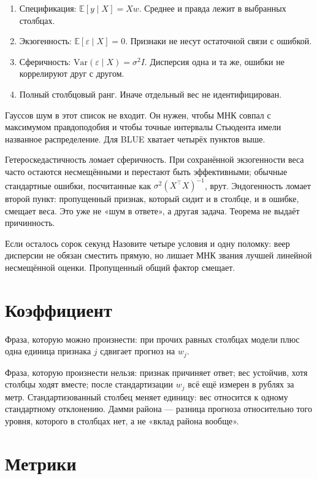 \documentclass[11pt,a4paper]{article}
\begin{document}
\begin{enumerate}
\item Спецификация: \(\mathbb E[y\mid X]=Xw\). Среднее и правда лежит в выбранных столбцах.
\item Экзогенность: \(\mathbb E[\varepsilon\mid X]=0\). Признаки не несут остаточной связи с ошибкой.
\item Сферичность: \(\mathrm{Var}(\varepsilon\mid X)=\sigma^{2}I\). Дисперсия одна и та же, ошибки не коррелируют друг с другом.
\item Полный столбцовый ранг. Иначе отдельный вес не идентифицирован.
\end{enumerate}

Гауссов шум в этот список не входит. Он нужен, чтобы МНК совпал с максимумом правдоподобия и чтобы точные интервалы Стьюдента имели названное распределение. Для BLUE хватает четырёх пунктов выше.

Гетероскедастичность ломает сферичность. При сохранённой экзогенности веса часто остаются несмещёнными и перестают быть эффективными; обычные стандартные ошибки, посчитанные как \(\sigma^{2}(X^{\top}X)^{-1}\), врут. Эндогенность ломает второй пункт: пропущенный признак, который сидит и в столбце, и в ошибке, смещает веса. Это уже не «шум в ответе», а другая задача. Теорема не выдаёт причинность.

\begin{saybox}{Если осталось сорок секунд}
Назовите четыре условия и одну поломку: веер дисперсии не обязан сместить прямую, но лишает МНК звания лучшей линейной несмещённой оценки. Пропущенный общий фактор смещает.
\end{saybox}

\section{Коэффициент}

Фраза, которую можно произнести: при прочих равных столбцах модели плюс одна единица признака \(j\) сдвигает прогноз на \(w_j\).

Фраза, которую произнести нельзя: признак причиняет ответ; вес устойчив, хотя столбцы ходят вместе; после стандартизации \(w_j\) всё ещё измерен в рублях за метр. Стандартизованный столбец меняет единицу: вес относится к одному стандартному отклонению. Дамми района --- разница прогноза относительно того уровня, которого в столбцах нет, а не «вклад района вообще».

\section{Метрики}
\end{document}
